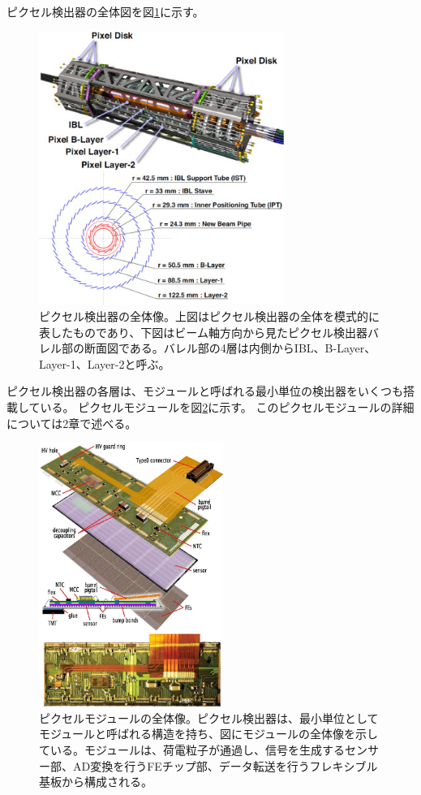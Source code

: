 ピクセル検出器の全体図を図\ref{pixel_detector_overview}に示す。
\begin{figure}[bpt]\centering
\includegraphics[width=8cm]{./pixel_detector_overview.jpg}
\caption[ピクセル検出器の全体像]{ピクセル検出器の全体像\cite{1-5}。上図はピクセル検出器の全体を模式的に表したものであり、下図はビーム軸方向から見たピクセル検出器バレル部の断面図である。バレル部の4層は内側からIBL、B-Layer、Layer-1、Layer-2と呼ぶ。}
\label{pixel_detector_overview}
\end{figure}

ピクセル検出器の各層は、モジュールと呼ばれる最小単位の検出器をいくつも搭載している。
ピクセルモジュールを図\ref{pixel_detector}に示す。
このピクセルモジュールの詳細については2章で述べる。
\begin{figure}[bpt]\centering
\includegraphics[width=6cm]{./pixel_detector.png}
\caption[ピクセルモジュールの全体像。]{ピクセルモジュールの全体像\cite{1-2}。ピクセル検出器は、最小単位としてモジュールと呼ばれる構造を持ち、図にモジュールの全体像を示している。モジュールは、荷電粒子が通過し、信号を生成するセンサー部、AD変換を行うFEチップ部、データ転送を行うフレキシブル基板から構成される。}
\label{pixel_detector}
\end{figure}


